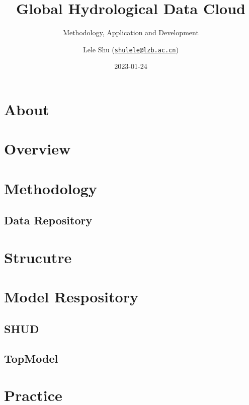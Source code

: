 \documentclass[
]{gitbook}
\title{Global Hydrological Data Cloud}
\subtitle{Methodology, Application and Development}
\author{Lele Shu (\href{mailto:shulele@lzb.ac.cn}{\nolinkurl{shulele@lzb.ac.cn}})}
\date{2023-01-24}
\begin{document}
\maketitle

{
\setcounter{tocdepth}{3}
\tableofcontents
}
\hypertarget{index}{%
\section*{About}\label{index}}

\hypertarget{overview}{%
\section{Overview}\label{overview}}

\hypertarget{method}{%
\section{Methodology}\label{method}}

\hypertarget{method-data}{%
\subsection{Data Repository}\label{method-data}}

\hypertarget{struct}{%
\section{Strucutre}\label{struct}}

\hypertarget{model}{%
\section{Model Respository}\label{model}}

\hypertarget{model-shud}{%
\subsection{SHUD}\label{model-shud}}

\hypertarget{model-topmodel}{%
\subsection{TopModel}\label{model-topmodel}}

\hypertarget{practice}{%
\section{Practice}\label{practice}}
\end{document}
